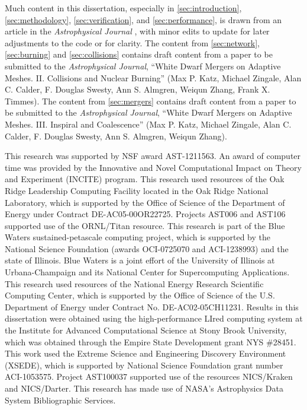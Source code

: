 \documentclass[12pt]{article}
\begin{document}
Much content in this dissertation, especially in \autoref{sec:introduction},
\autoref{sec:methodology}, \autoref{sec:verification}, and \autoref{sec:performance},
is drawn from an article in the \textit{Astrophysical Journal} \citep{wdmergerI},
with minor edits to update for later adjustments to the code or for clarity. The content
from \autoref{sec:network}, \autoref{sec:burning} and \autoref{sec:collisions} contains draft content from
a paper to be submitted to the \textit{Astrophysical Journal}, ``White Dwarf Mergers on
Adaptive Meshes. II. Collisions and Nuclear Burning'' (Max P. Katz, Michael Zingale,
Alan C. Calder, F. Douglas Swesty, Ann S. Almgren, Weiqun Zhang, Frank X. Timmes).
The content from \autoref{sec:mergers} contains draft content from a paper to be
submitted to the \textit{Astrophysical Journal}, ``White Dwarf Mergers on Adaptive
Meshes. III. Inspiral and Coalescence'' (Max P. Katz, Michael Zingale, Alan C. Calder,
F. Douglas Swesty, Ann S. Almgren, Weiqun Zhang).

This research was supported by NSF award AST-1211563. An
award of computer time was provided by the Innovative and Novel
Computational Impact on Theory and Experiment (INCITE) program.  This
research used resources of the Oak Ridge Leadership Computing Facility
located in the Oak Ridge National Laboratory, which is supported by
the Office of Science of the Department of Energy under Contract
DE-AC05-00OR22725. Projects AST006 and AST106 supported use of the ORNL/Titan resource. 
This research is part of the Blue Waters sustained-petascale computing project, 
which is supported by the National Science Foundation (awards OCI-0725070 
and ACI-1238993) and the state of Illinois. Blue Waters is a joint 
effort of the University of Illinois at Urbana-Champaign and its 
National Center for Supercomputing Applications.
This research used resources of the National Energy Research Scientific Computing
Center, which is supported by the Office of Science of the
U.S. Department of Energy under Contract No. DE-AC02-05CH11231.
Results in this dissertation were obtained using the high-performance
LIred computing system at the Institute for Advanced Computational
Science at Stony Brook University, which was obtained through
the Empire State Development grant NYS \#28451. 
This work used the Extreme Science and Engineering Discovery Environment (XSEDE), 
which is supported by National Science Foundation grant number ACI-1053575. 
Project AST100037 supported use of the resources NICS/Kraken and NICS/Darter.
This research has made use of NASA's Astrophysics Data System 
Bibliographic Services.
\end{document}
